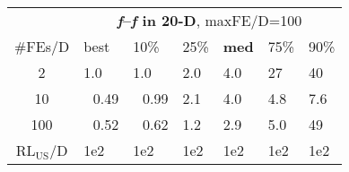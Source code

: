 \begin{tabular}{c|llllll}
 & \multicolumn{6}{|c}{\textbf{\textit{f}\raisebox{-0.35ex}{1}--\textit{f}\raisebox{-0.35ex}{24} in 20-D}, maxFE/D=100}\\
\#FEs/D & best & 10\% & 25\% & \textbf{med} & 75\% & 90\%\\
2 & \hspace*{1ex}1.0 & \hspace*{1ex}1.0 & \hspace*{1ex}2.0 & \hspace*{1ex}4.0 & 27 & 40\\
10 & ~\,0.49 & ~\,0.99 & \hspace*{1ex}2.1 & \hspace*{1ex}4.0 & \hspace*{1ex}4.8 & \hspace*{1ex}7.6\\
100 & ~\,0.52 & ~\,0.62 & \hspace*{1ex}1.2 & \hspace*{1ex}2.9 & \hspace*{1ex}5.0 & 49\\
$\text{RL}_{\text{US}}$/D & 1e2 & 1e2 & 1e2 & 1e2 & 1e2 & 1e2
\end{tabular}
